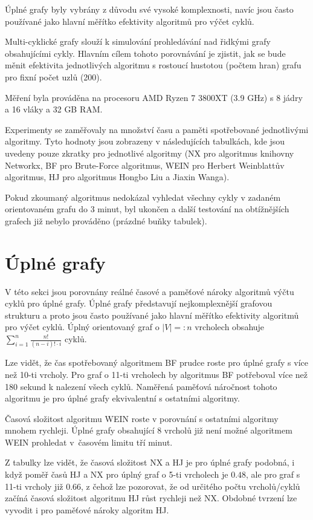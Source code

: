     Úplné grafy byly vybrány z důvodu své vysoké komplexnosti, navíc jsou často používané jako hlavní měřítko efektivity algoritmů pro výčet cyklů.

    Multi-cyklické grafy slouží k simulování prohledávání nad řidkými grafy obsahujícími cykly. Hlavním cílem tohoto porovnávání je zjistit, jak se bude měnit efektivita jednotlivých algoritmu s rostoucí hustotou (počtem hran) grafu pro fixní počet uzlů (200).

    Měření byla prováděna na procesoru AMD Ryzen 7 3800XT (3.9 GHz) s 8 jádry a 16 vláky a 32 GB RAM.

    Experimenty se zaměřovaly na množství času a paměti spotřebované jednotlivými algoritmy. Tyto hodnoty jsou zobrazeny v následujících tabulkách, kde jsou uvedeny pouze zkratky pro jednotlivé algoritmy (NX pro algoritmus knihovny Networkx, BF pro Brute-Force algoritmus, WEIN pro Herbert Weinblattův algoritmus, HJ pro algoritmus Hongbo Liu a Jiaxin Wanga).

    Pokud zkoumaný algoritmus nedokázal vyhledat všechny cykly v zadaném orientovaném grafu do 3 minut, byl ukončen a další testování na obtížnějších grafech již nebylo prováděno (prázdné buňky tabulek).

    \section{Úplné grafy}
        V této sekci jsou porovnány reálné časové a paměťové nároky algoritmů výčtu cyklů pro úplné grafy. Úplné grafy představují nejkomplexnější grafovou strukturu a proto jsou často používané jako hlavní měřítko efektivity algoritmů pro výčet cyklů. Úplný orientovaný graf o $|V| =: n$ vrcholech obsahuje $\sum_{i=1}^n \frac{n!}{(n-i)! \cdot i}$ cyklů.

        Lze vidět, že čas spotřebovaný algoritmem BF prudce roste pro úplné grafy s více než 10-ti vrcholy. Pro graf o 11-ti vrcholech by algoritmus BF potřeboval více než 180 sekund k nalezení všech cyklů. Naměřená paměťová náročnost tohoto algoritmu je pro úplné grafy ekvivalentní s ostatními algoritmy.

        Časová složitost algoritmu WEIN roste v porovnání s ostatními algoritmy mnohem rychleji. Úplné grafy obsahující 8 vrcholů již není možné algoritmem WEIN prohledat v~časovém limitu tří minut.

        Z tabulky lze vidět, že časová složitost NX a HJ je pro úplné grafy podobná, i když poměř časů HJ a NX pro úplný graf o 5-ti vrcholech je $0.48$, ale pro graf s 11-ti vrcholy již $0.66$, z čehož lze pozorovat, že od určitého počtu vrcholů/cyklů začíná časová složitost algoritmu HJ růst rychleji než NX. Obdobné tvrzení lze vyvodit i pro paměťové nároky algoritm HJ.

